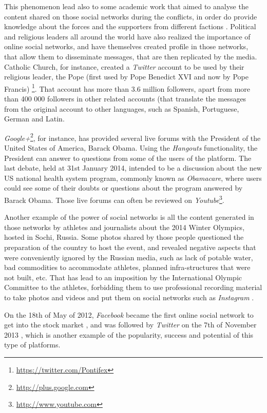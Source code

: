 This phenomenon lead also to some academic work that aimed to analyse the content shared on those social networks during the conflicts, in order do provide knowledge about the forces and the supporters from different factions \cite{kn:OPG+14}.
Political and religious leaders all around the world have also realized the importance of online social networks, and have themselves created profile in those networks, that allow them to disseminate messages, that are then replicated by the media. Catholic Church, for instance, created a \emph{Twitter} account to be used by their religious leader, the Pope (first used by Pope Benedict XVI and now by Pope Francis) \footnote{\url{https://twitter.com/Pontifex}}. That account has more than 3.6 million followers, apart from more than 400 000 followers in other related accounts (that translate the messages from the original account to other languages, such as Spanish, Portuguese, German and Latin.

\emph{Google+}\footnote{\url{http://plus.google.com}}, for instance, has provided several live forums with the President of the United States of America, Barack Obama. Using the \emph{Hangouts} functionality, the President can answer to questions from some of the users of the platform. The last debate, held at 31st January 2014, intended to be a discussion about the new US national health system program, commonly known as \emph{Obamacare}, where users could see some of their doubts or questions about the program answered by Barack Obama. Those live forums can often be reviewed on \emph{Youtube}\footnote{\url{http://www.youtube.com}}.

Another example of the power of social networks is all the content generated in those networks by athletes and journalists about the 2014 Winter Olympics, hosted in Sochi, Russia. Some photos shared by those people questioned the preparation of the country to host the event, and revealed negative aspects that were conveniently ignored by the Russian media, such as lack of potable water, bad commodities to accommodate athletes, planned infra-structures that were not built, etc. That has lead to an imposition by the International Olympic Committee to the athletes, forbidding them to use professional recording material to take photos and videos and put them on social networks such as \emph{Instagram} \cite{kn:Sop14}.

On the 18th of May of 2012, \emph{Facebook} became the first online social network to get into the stock market \cite{kn:Del11}, and was followed by \emph{Twitter} on the 7th of November 2013 \cite{kn:Pos13}, which is another example of the popularity, success and potential of this type of platforms. 

